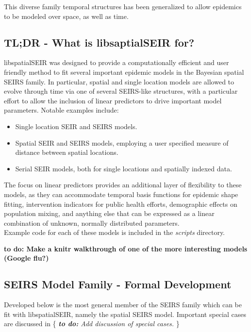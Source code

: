 \documentclass[12pt]{article}
\begin{document}
This diverse family temporal structures has been generalized to allow epidemics to be modeled over space, as well as time.  

\subsection{TL;DR - What is libsaptialSEIR for?}

libspatialSEIR was designed to provide a computationally efficient and user friendly method to fit several important epidemic 
models in the Bayesian spatial SEIRS family. In particular, spatial and single location models are allowed to evolve through 
time via one of several SEIRS-like structures, with a particular effort to allow the inclusion of linear predictors to drive
important model parameters. Notable examples include:

\begin{itemize}
    \item Single location SEIR and SEIRS models.   
    \item Spatial SEIR and SEIRS models, employing a user specified measure of distance between spatial locations. 
    \item Serial SEIR models, both for single locations and spatially indexed data. 
\end{itemize}

The focus on linear predictors provides an additional layer of flexibility to these models, as they can accommodate 
temporal basis functions for epidemic shape fitting, intervention indicators for public health efforts, demographic 
effects on population mixing, and anything else that can be expressed as a linear combination of unknown, normally
distributed parameters.\\ 


Example code for each of these models is included in the \textit{scripts} directory.

{\bf{to do: Make a knitr walkthrough of one of the more interesting models (Google flu?)}}


\subsection{SEIRS Model Family - Formal Development}
        Developed below is the most general member of the SEIRS family which can be fit with libspatialSEIR, 
        namely the spatial SEIRS model. Important special cases are discussed in \{ \textit{{\bf{to do:}} Add discussion of special cases.} \}
\end{document}
